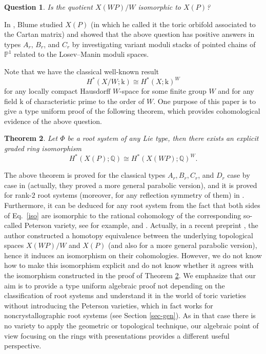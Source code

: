 \documentclass{amsart}
\newtheorem{theorem}{Theorem}[section]
\newtheorem{question}[theorem]{Question}
\theoremstyle{definition}
\theoremstyle{remark}
\numberwithin{equation}{section}
\begin{document}
\begin{question} \label{ques}
    Is the quotient $X(\mathit{WP}) / W$ isomorphic to $X(P)$?
\end{question}

In \cite{Blume15}, Blume studied $X(P)$ (in which he called it the toric orbifold associated to the Cartan matrix) and showed that the above question has positive answers in types $A_r$, $B_r$, and $C_r$ by investigating variant moduli stacks of pointed chains of $\mathbb{P}^1$ related to the Losev--Manin moduli spaces.

Note that we have the classical well-known result
$$
H^*(X / W ; \mathrm{k}) \cong H^*(X ; \mathrm{k})^W
$$
for any locally compact Hausdorff $W$-space for some finite group $W$ and for any field $\mathrm{k}$ of characteristic prime to the order of $W$. One purpose of this paper is to give a type uniform proof of the following theorem, which provides cohomological evidence of the above question.

\begin{theorem} \label{thm-main}
   Let $\Phi$ be a root system of any Lie type, then there exists an explicit graded ring isomorphism
   \begin{equation} \label{iso}
     H^*\left(X(P) ; \mathbb{Q}\right) \cong H^*\left(X(\mathit{WP}) ; \mathbb{Q}\right)^W.      
   \end{equation}
\end{theorem} 

The above theorem is proved for the classical types $A_r, B_r, C_r$, and $D_r$ case by case in \cite{HMSS21-toric-orbifolds} (actually, they proved a more general parabolic version), and it is proved for rank-$2$ root systems (moreover, for any reflection symmetry of them) in \cite{Song22}. Furthermore, it can be deduced for any root system from the fact that both sides of Eq.~\eqref{iso} are isomorphic to the rational cohomology of the corresponding so-called Peterson variety, see for example, \cite{abe2023peterson} and \cite{zbMATH07273426}. Actually, in a recent preprint \cite{gong2024homotopytypestoricorbifolds}, the author constructed a homotopy equivalence between the underlying topological spaces $X(\mathit{WP}) / W$ and $X(P)$ (and also for a more general parabolic version), hence it induces an isomorphism on their cohomologies. 
However, we do not know how to make this isomorphism explicit and do not know whether it agrees with the isomorphism constructed in the proof of Theorem \ref{thm-main}.
We emphasize that our aim is to provide a type uniform algebraic proof not depending on the classification of root systems and understand it in the world of toric varieties without introducing the Peterson varieties, which in fact works for noncrystallographic root systems (see Section \ref{sec-gen}). As in that case there is no variety to apply the geometric or topological technique, our algebraic point of view focusing on the rings with presentations provides a different useful perspective.
\end{document}
